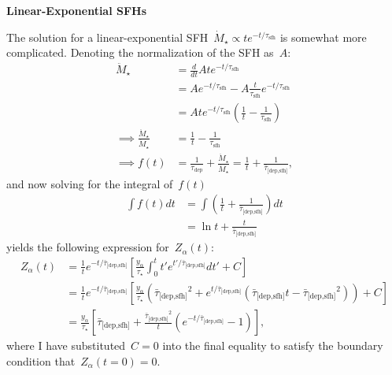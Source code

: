 \documentclass[12pt]{article}
\newcommand{\timescale}[1]{\ensuremath{\tau_\text{#1}}}
\newcommand{\harmonic}[2]{\ensuremath{\bar{\tau}_\text{[#1,#2]}}}
\begin{document}
\par\null\par\noindent
{\large \textbf{Linear-Exponential SFHs}}
\par\noindent
The solution for a linear-exponential SFH~$\dot{M}_\star \propto t e^{-t /
\timescale{sfh}}$ is somewhat more complicated.
Denoting the normalization of the SFH as~$A$:
\begin{subequations}\begin{align}
\ddot{M}_\star &= \frac{d}{dt} Ate^{-t / \timescale{sfh}}
\\
&= Ae^{-t / \timescale{sfh}} - A\frac{t}{\timescale{sfh}}
e^{-t / \timescale{sfh}}
\\
&= Ate^{-t / \timescale{sfh}} \left(\frac{1}{t} - \frac{1}{\timescale{sfh}}
\right)
\\
\implies \frac{\ddot{M}_\star}{\dot{M}_\star} &= \frac{1}{t} -
\frac{1}{\timescale{sfh}}
\\
\implies f(t) &= \frac{1}{\timescale{dep}} +
\frac{\ddot{M}_\star}{\dot{M}_\star} = \frac{1}{t} +
\frac{1}{\harmonic{dep}{sfh}},
\end{align}\end{subequations}
and now solving for the integral of~$f(t)$
\begin{subequations}\begin{align}
\int f(t) dt &= \int \left(\frac{1}{t} + \frac{1}{\harmonic{dep}{sfh}}\right) dt
\\
&= \ln t + \frac{t}{\harmonic{dep}{sfh}}
\end{align}\end{subequations}
yields the following expression for~$Z_\alpha(t)$:
\begin{subequations}\begin{align}
Z_\alpha(t) &= \frac{1}{t}e^{-t / \harmonic{dep}{sfh}} \left[
\frac{y_\alpha}{\tau_\star} \int_0^t t' e^{t' / \harmonic{dep}{sfh}} dt' + C
\right]
\\
&= \frac{1}{t}e^{-t / \harmonic{dep}{sfh}} \left[
\frac{y_\alpha}{\tau_\star}\left(
\harmonic{dep}{sfh}^2 + e^{t / \harmonic{dep}{sfh}} \left(\harmonic{dep}{sfh}
t - \harmonic{dep}{sfh}^2\right)
\right) + C\right]
\\
&= \frac{y_\alpha}{\tau_\star} \left[
\harmonic{dep}{sfh} + \frac{\harmonic{dep}{sfh}^2}{t}
\left(e^{-t / \harmonic{dep}{sfh}} - 1\right)
\right],
\end{align}\end{subequations}
where I have substituted~$C = 0$ into the final equality to satisfy the
boundary condition that~$Z_\alpha(t = 0) = 0$.
\end{document}
